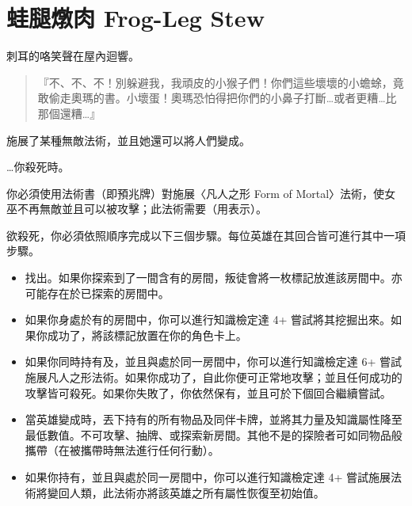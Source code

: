 
\chapter{蛙腿燉肉 Frog-Leg Stew}

\begin{HauntStory}
  刺耳的咯笑聲在屋內迴響。
  \begin{quote}
    『不、不、不！別躲避我，我頑皮的小猴子們！你們這些壞壞的小蟾蜍，竟敢偷走奧瑪的書。小壞蛋！奧瑪恐怕得把你們的小鼻子打斷…或者更糟…比那個還糟…』
  \end{quote}
\end{HauntStory}

施展了某種無敵法術，並且她還可以將人們變成。

…你殺死時。

你必須使用法術書（即預兆牌）對施展〈凡人之形 Form of Mortal〉法術，使女巫不再無敵並且可以被攻擊；此法術需要（用表示）。

欲殺死，你必須依照順序完成以下三個步驟。每位英雄在其回合皆可進行其中一項步驟。
\begin{itemize}
  \item 找出。如果你探索到了一間含有的房間，叛徒會將一枚標記放進該房間中。亦可能存在於已探索的房間中。
  \item 如果你身處於有的房間中，你可以進行知識檢定達 4+ 嘗試將其挖掘出來。如果你成功了，將該標記放置在你的角色卡上。
  \item 如果你同時持有及，並且與處於同一房間中，你可以進行知識檢定達 6+ 嘗試施展凡人之形法術。如果你成功了，自此你便可正常地攻擊；並且任何成功的攻擊皆可殺死。如果你失敗了，你依然保有，並且可於下個回合繼續嘗試。
\end{itemize}

\vfill\null\pagebreak

\vspace*{-1em}
\begin{itemize}
  \item 當英雄變成時，丟下持有的所有物品及同伴卡牌，並將其力量及知識屬性降至最低數值。不可攻擊、抽牌、或探索新房間。其他不是的探險者可如同物品般攜帶（在被攜帶時無法進行任何行動）。
  \item 如果你持有，並且與處於同一房間中，你可以進行知識檢定達 4+ 嘗試施展法術將變回人類，此法術亦將該英雄之所有屬性恢復至初始值。
\end{itemize}

